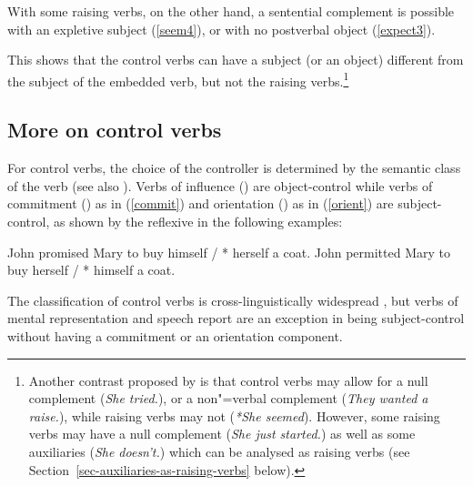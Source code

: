 \documentclass[output=paper
	        ,collection
	        ,collectionchapter
 	        ,biblatex
                ,babelshorthands
                ,newtxmath
                ,draftmode
                ,colorlinks, citecolor=brown
]{langscibook}
\begin{document}
\eal
{}
\zl

\eal
{}
\zl

With some raising verbs, on the other hand, a sentential complement is possible with an expletive subject (\ref{seem4}), or with no postverbal object (\ref{expect3}).

\eal
{}
\zl

This shows that the control verbs can have a subject (or an object) different from the subject of the embedded verb, but not the raising verbs.\footnote{Another contrast proposed by \citet{Jacobson1990} is that control verbs may allow for a null complement (\emph{She tried.}), or a non"=verbal complement (\emph{They wanted a raise.}), while raising verbs may not (\emph{*She seemed}). However, some raising verbs may have a null complement (\emph{She just started.}) as well as some auxiliaries (\emph{She doesn't.}) which can be analysed as raising verbs (see Section~\ref{sec-auxiliaries-as-raising-verbs} below).}

\subsection{More on control verbs}

For control verbs, the choice of the controller is determined by the semantic class of the verb \citet[Chapter~3]{PollardandSag1992} (see also \citealt{JackendoffandCulicover2003}).  Verbs of influence () are object-control
while verbs of commitment () as in (\ref{commit}) and orientation () as in (\ref{orient}) are subject-control, as shown by the reflexive in the following examples:

\begin{exe}
	\ex \begin{xlist}
	\ex John promised Mary to buy himself / * herself a coat. \label{commit}
   \ex 	John permitted Mary to buy herself / * himself a coat.\label{orient}
 \end{xlist}
 \end{exe}
 
  The classification of control verbs is cross-linguistically widespread \citep{VanValinandLapolla1997}, but  verbs of mental representation and speech report are an exception in being subject-control without having a commitment or an orientation component.
\end{document}
